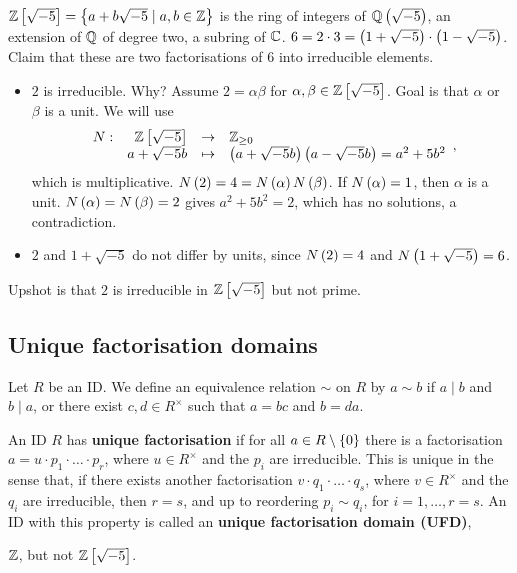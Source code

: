 \begin{example*}
$ \mathbb{Z}\left[ \sqrt{-5} \right] = \left\{ a + b\sqrt{-5} \mid a, b \in \mathbb{Z} \right\} $ is the ring of integers of $ \mathbb{Q}\left( \sqrt{-5} \right) $, an extension of $ \mathbb{Q} $ of degree two, a subring of $ \mathbb{C} $. $ 6 = 2 \cdot 3 = \left( 1 + \sqrt{-5} \right) \cdot \left( 1 - \sqrt{-5} \right) $. Claim that these are two factorisations of $ 6 $ into irreducible elements.
\begin{itemize}
\item $ 2 $ is irreducible. Why? Assume $ 2 = \alpha\beta $ for $ \alpha, \beta \in \mathbb{Z}\left[ \sqrt{-5} \right] $. Goal is that $ \alpha $ or $ \beta $ is a unit. We will use
$$ \function[N]{\Z\sb{\sqrt{-5}}}{\Z_{\ge 0}}{a + \sqrt{-5}b}{\rb{a + \sqrt{-5}b}\rb{a - \sqrt{-5}b} = a^2 + 5b^2}, $$
which is multiplicative. $ N\left( 2 \right) = 4 = N\left( \alpha \right)N\left( \beta \right) $. If $ N\left( \alpha \right) = 1 $, then $ \alpha $ is a unit. $ N\left( \alpha \right) = N\left( \beta \right) = 2 $ gives $ a^2 + 5b^2 = 2 $, which has no solutions, a contradiction.
\item $ 2 $ and $ 1 + \sqrt{-5} $ do not differ by units, since $ N\left( 2 \right) = 4 $ and $ N\left( 1 + \sqrt{-5} \right) = 6 $.
\end{itemize}
Upshot is that $ 2 $ is irreducible in $ \mathbb{Z}\left[ \sqrt{-5} \right] $ but not prime.
\end{example*}

\pagebreak

\subsection{Unique factorisation domains}

Let $ R $ be an ID. We define an equivalence relation $ \sim $ on $ R $ by $ a \sim b $ if $ a \mid b $ and $ b \mid a $, or there exist $ c, d \in R^\times $ such that $ a = bc $ and $ b = da $.

\begin{definition}
An ID $ R $ has \textbf{unique factorisation} if for all $ a \in R \setminus \left\{ 0 \right\} $ there is a factorisation $ a = u \cdot p_1 \cdot \dots \cdot p_r $, where $ u \in R^\times $ and the $ p_i $ are irreducible. This is unique in the sense that, if there exists another factorisation $ v \cdot q_1 \cdot \dots \cdot q_s $, where $ v \in R^\times $ and the $ q_i $ are irreducible, then $ r = s $, and up to reordering $ p_i \sim q_i $, for $ i = 1, \dots, r = s $. An ID with this property is called an \textbf{unique factorisation domain (UFD)},
\end{definition}

\begin{example*}
$ \mathbb{Z} $, but not $ \mathbb{Z}\left[ \sqrt{-5} \right] $.
\end{example*}

